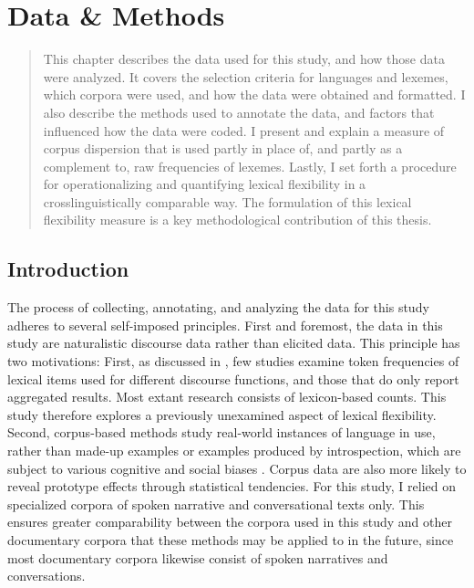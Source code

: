 \chapter{Data \& Methods}
\label{ch:methods}

\blockquote{This chapter describes the data used for this study, and how those data were analyzed. It covers the selection criteria for languages and lexemes, which corpora were used, and how the data were obtained and formatted. I also describe the methods used to annotate the data, and factors that influenced how the data were coded. I present and explain a measure of corpus dispersion that is used partly in place of, and partly as a complement to, raw frequencies of lexemes. Lastly, I set forth a procedure for operationalizing and quantifying lexical flexibility in a crosslinguistically comparable way. The formulation of this lexical flexibility measure is a key methodological contribution of this thesis.}

\section{Introduction}
\label{sec:3.1}

The process of collecting, annotating, and analyzing the data for this study adheres to several self-imposed principles. First and foremost, the data in this study are naturalistic discourse data rather than elicited data. This principle has two motivations: First, as discussed in , few studies examine token frequencies of lexical items used for different discourse functions, and those that do only report aggregated results. Most extant research consists of lexicon-based counts. This study therefore explores a previously unexamined aspect of lexical flexibility. Second, corpus-based methods study real-world instances of language in use, rather than made-up examples or examples produced by introspection, which are subject to various cognitive and social biases \parencite[168]{Baker2018}.  Corpus data are also more likely to reveal prototype effects through statistical tendencies. For this study, I relied on specialized corpora of spoken narrative and conversational texts only. This ensures greater comparability between the corpora used in this study and other documentary corpora that these methods may be applied to in the future, since most documentary corpora likewise consist of spoken narratives and conversations.

